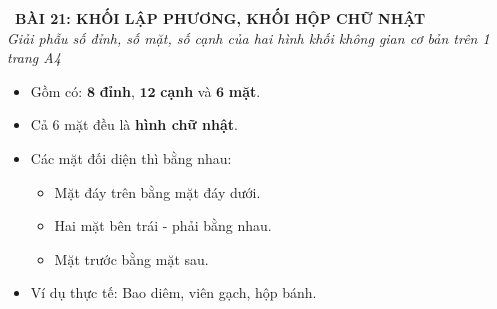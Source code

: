 \documentclass[12pt,a4paper]{article}
\begin{document}
\begin{tcolorbox}[
  enhanced,
  colback=teal!8!white,
  colframe=teal!70!black,
  arc=3mm, boxrule=1.2pt,
  left=3mm, right=3mm, top=2mm, bottom=2mm,
  halign=center
]
  {\LARGE\bfseries\color{teal!90!black}\faBookmark\ BÀI 21: KHỐI LẬP PHƯƠNG, KHỐI HỘP CHỮ NHẬT}\\[1mm]
  {\itshape\footnotesize\color{black!75} Giải phẫu số đỉnh, số mặt, số cạnh của hai hình khối không gian cơ bản trên 1 trang A4}
\end{tcolorbox}

\vspace{-2mm}

\noindent
\begin{minipage}[t]{0.49\textwidth}\vspace{0pt}
\begin{tcolorbox}[
  enhanced,
  colback=blue!4!white,
  colframe=blue!75!black,
  arc=2mm, boxrule=0.8pt,
  left=2mm, right=2mm, top=1.8mm, bottom=1.8mm,
  title={\footnotesize\bfseries\color{white}\faCube\ 1. Khối hộp chữ nhật}
]
{\footnotesize
\begin{itemize}\setlength{\itemsep}{1pt}\setlength{\leftskip}{-2.5mm}
  \item Gồm có: $\mathbf{8}$ \textbf{đỉnh}, $\mathbf{12}$ \textbf{cạnh} và $\mathbf{6}$ \textbf{mặt}.
  \item Cả $6$ mặt đều là \textbf{hình chữ nhật}.
  \item Các mặt đối diện thì bằng nhau:
  \begin{itemize}\setlength{\itemsep}{0.5pt}\setlength{\leftskip}{-2.5mm}
    \item Mặt đáy trên bằng mặt đáy dưới.
    \item Hai mặt bên trái - phải bằng nhau.
    \item Mặt trước bằng mặt sau.
  \end{itemize}
  \item Ví dụ thực tế: Bao diêm, viên gạch, hộp bánh.
\end{itemize}
}
\end{tcolorbox}
\end{minipage}
\hfill
\end{document}
